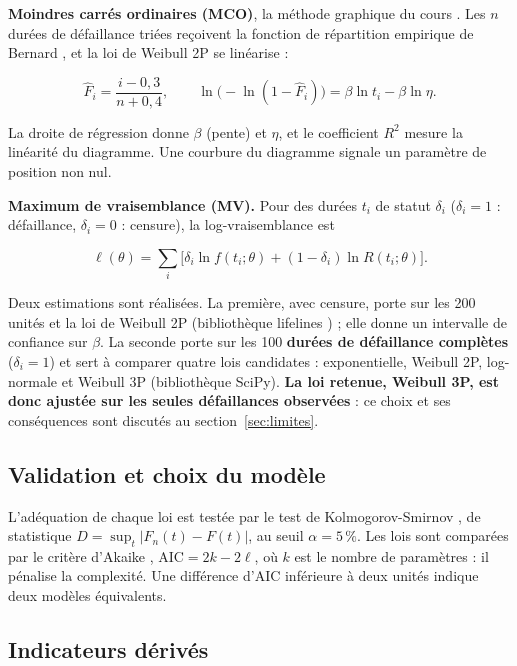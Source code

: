 \textbf{Moindres carrés ordinaires (MCO)}, la méthode graphique du cours \cite{benhmida}. Les $n$ durées de défaillance triées reçoivent la fonction de répartition empirique de Bernard \cite{bernard1953}, et la loi de Weibull 2P se linéarise :

\begin{equation}\label{eq:bernard}
\hat F_i = \frac{i - 0{,}3}{n + 0{,}4}, \qquad \ln\!\big(-\ln(1-\hat F_i)\big) = \beta \ln t_i - \beta \ln \eta .
\end{equation}

La droite de régression donne $\beta$ (pente) et $\eta$, et le coefficient $R^2$ mesure la linéarité du diagramme. Une courbure du diagramme signale un paramètre de position non nul.

\textbf{Maximum de vraisemblance (MV).} Pour des durées $t_i$ de statut $\delta_i$ ($\delta_i = 1$ : défaillance, $\delta_i = 0$ : censure), la log-vraisemblance est

\begin{equation}\label{eq:vraisemblance}
\ell(\theta) = \sum_i \Big[\delta_i \ln f(t_i; \theta) + (1 - \delta_i) \ln R(t_i; \theta)\Big].
\end{equation}

Deux estimations sont réalisées. La première, avec censure, porte sur les 200 unités et la loi de Weibull 2P (bibliothèque lifelines \cite{davidsonpilon2019}) ; elle donne un intervalle de confiance sur $\beta$. La seconde porte sur les 100 \textbf{durées de défaillance complètes} ($\delta_i = 1$) et sert à comparer quatre lois candidates : exponentielle, Weibull 2P, log-normale et Weibull 3P (bibliothèque SciPy). \textbf{La loi retenue, Weibull 3P, est donc ajustée sur les seules défaillances observées} : ce choix et ses conséquences sont discutés au section~\ref{sec:limites}.

\subsection{Validation et choix du modèle}

L'adéquation de chaque loi est testée par le test de Kolmogorov-Smirnov \cite{massey1951}, de statistique $D = \sup_t |F_n(t) - F(t)|$, au seuil $\alpha = 5\,\%$. Les lois sont comparées par le critère d'Akaike \cite{akaike1974}, $\mathrm{AIC} = 2k - 2\ell$, où $k$ est le nombre de paramètres : il pénalise la complexité. Une différence d'AIC inférieure à deux unités indique deux modèles équivalents.

\subsection{Indicateurs dérivés}

